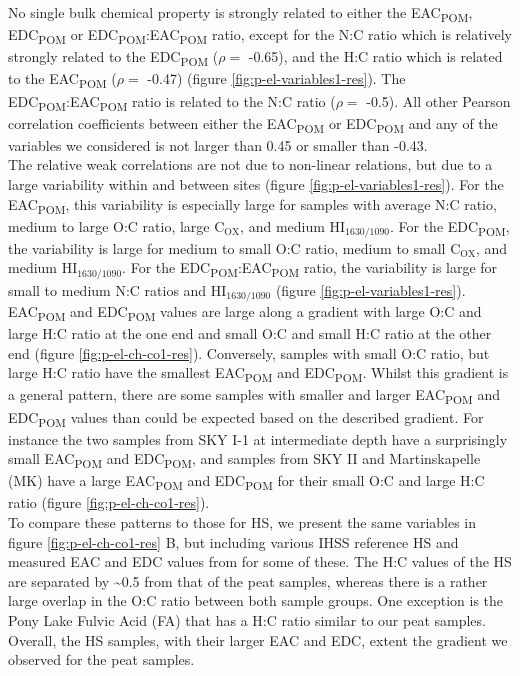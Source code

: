 \documentclass[alpha-refs]{wiley-article-rmd}
\begin{document}
\begin{refsection}
No single bulk chemical property is strongly related to either the EAC\textsubscript{POM}, EDC\textsubscript{POM} or EDC\textsubscript{POM}:EAC\textsubscript{POM} ratio, except for the N:C ratio which is relatively strongly related to the EDC\textsubscript{POM} (\(\rho=\) -0.65), and the H:C ratio which is related to the EAC\textsubscript{POM} (\(\rho=\) -0.47) (figure \ref{fig:p-el-variables1-res}). The EDC\textsubscript{POM}:EAC\textsubscript{POM} ratio is related to the N:C ratio (\(\rho=\) -0.5). All other Pearson correlation coefficients between either the EAC\textsubscript{POM} or EDC\textsubscript{POM} and any of the variables we considered is not larger than 0.45 or smaller than -0.43.\\
The relative weak correlations are not due to non-linear relations, but due to a large variability within and between sites (figure \ref{fig:p-el-variables1-res}). For the EAC\textsubscript{POM}, this variability is especially large for samples with average N:C ratio, medium to large O:C ratio, large C\(_\text{OX}\), and medium HI\(_\text{1630/1090}\). For the EDC\textsubscript{POM}, the variability is large for medium to small O:C ratio, medium to small C\(_\text{OX}\), and medium HI\(_\text{1630/1090}\). For the EDC\textsubscript{POM}:EAC\textsubscript{POM} ratio, the variability is large for small to medium N:C ratios and HI\(_\text{1630/1090}\) (figure \ref{fig:p-el-variables1-res}).\\
EAC\textsubscript{POM} and EDC\textsubscript{POM} values are large along a gradient with large O:C and large H:C ratio at the one end and small O:C and small H:C ratio at the other end (figure \ref{fig:p-el-ch-co1-res}). Conversely, samples with small O:C ratio, but large H:C ratio have the smallest EAC\textsubscript{POM} and EDC\textsubscript{POM}. Whilst this gradient is a general pattern, there are some samples with smaller and larger EAC\textsubscript{POM} and EDC\textsubscript{POM} values than could be expected based on the described gradient. For instance the two samples from SKY I-1 at intermediate depth have a surprisingly small EAC\textsubscript{POM} and EDC\textsubscript{POM}, and samples from SKY II and Martinskapelle (MK) have a large EAC\textsubscript{POM} and EDC\textsubscript{POM} for their small O:C and large H:C ratio (figure \ref{fig:p-el-ch-co1-res}).\\
To compare these patterns to those for HS, we present the same variables in figure \ref{fig:p-el-ch-co1-res} B, but including various IHSS reference HS and measured EAC and EDC values from \textcite{Aeschbacher.2012} for some of these. The H:C values of the HS are separated by \textasciitilde0.5 from that of the peat samples, whereas there is a rather large overlap in the O:C ratio between both sample groups. One exception is the Pony Lake Fulvic Acid (FA) that has a H:C ratio similar to our peat samples. Overall, the HS samples, with their larger EAC and EDC, extent the gradient we observed for the peat samples.

\end{refsection}
\end{document}
